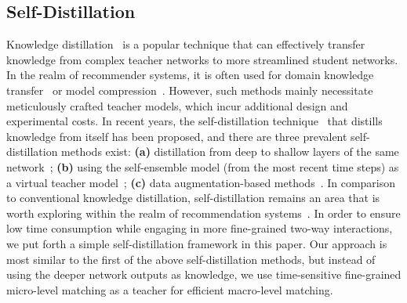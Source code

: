 \subsection{Self-Distillation}
Knowledge distillation~\cite{hinton2015distilling} is a popular technique that can effectively transfer knowledge from complex teacher networks to more streamlined student networks. In the realm of recommender systems, it is often used for domain knowledge transfer~\cite{yang2022cross,tu2021conditional} or model compression~\cite{kang2021topology,tian2023directed}. However, such methods mainly necessitate meticulously crafted teacher models, which incur additional design and experimental costs. 
In recent years, the self-distillation technique~\cite{zhang2019your} that distills knowledge from itself has been proposed, and there are three prevalent self-distillation methods exist: \textbf{(a)} distillation from deep to shallow layers of the same network~\cite{zhang2019your,luan2019msd,liu2020fastbert}; \textbf{(b)} using the self-ensemble model (from the most recent time steps) as a virtual teacher model~\cite{xu2020improving,shen2022self}; \textbf{(c)} data augmentation-based methods~\cite{huang2020comprehensive,xu2019data}.
In comparison to conventional knowledge distillation, self-distillation remains an area that is worth exploring within the realm of recommendation systems~\cite{xia2022device}.
In order to ensure low time consumption while engaging in more fine-grained two-way interactions, we put forth a simple self-distillation framework in this paper.
Our approach is most similar to the first of the above self-distillation methods, but instead of using the deeper network outputs as knowledge, we use time-sensitive fine-grained micro-level matching as a teacher for efficient macro-level matching.






